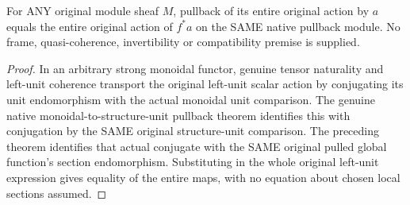 \begin{theorem}
\label{sc0-unit-scalar-base-change:whole-scalar}
\leanok
For ANY original module sheaf $M$, pullback of its entire original action
by $a$ equals the entire original action of $f^*a$ on the SAME native
pullback module. No frame, quasi-coherence, invertibility or compatibility
premise is supplied.
\end{theorem}
\begin{proof}
In an arbitrary strong monoidal functor, genuine tensor naturality and
left-unit coherence transport the original left-unit scalar action by
conjugating its unit endomorphism with the actual monoidal unit comparison.
The genuine native monoidal-to-structure-unit pullback theorem identifies
this with conjugation by the SAME original structure-unit comparison.
The preceding theorem identifies that actual conjugate with the SAME
original pulled global function's section endomorphism. Substituting in
the whole original left-unit expression gives equality of the entire
maps, with no equation about chosen local sections assumed.
\end{proof}
